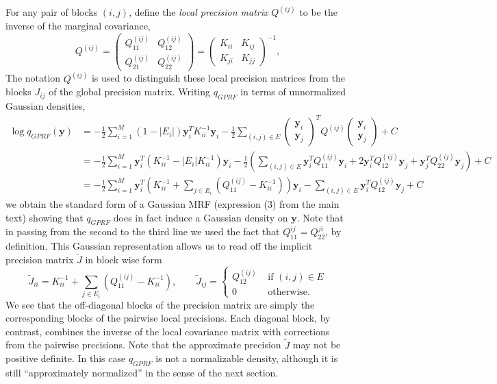\documentclass{article}
\renewcommand{\v}[1]{\mathbf{#1}}
\begin{document}
For any pair of blocks $(i,j)$, define the {\em local precision  matrix} $Q^{(ij)}$ to be the inverse of the marginal covariance,
\[Q^{(ij)} = \left(\begin{array}{cc} Q^{(ij)}_{11} &  Q^{(ij)}_{12}\\
  Q^{(ij)}_{21}  & Q^{(ij)}_{22}\end{array}\right) = \left(\begin{array}{cc} K_{ii} &  K_{ij}\\
  K_{ji}  & K_{jj}\end{array}\right)^{-1},\]
The notation $Q^{(ij)}$ is used to distinguish these local precision
matrices from the blocks $J_{ij}$ of the global precision matrix. Writing $q_{GPRF}$ in terms of unnormalized Gaussian densities,
\begin{align*}
\log q_{GPRF}(\v{y}) &= -\frac{1}{2} \sum_{i=1}^M (1-|E_i|) \v{y}_i^T
K_{ii}^{-1} \v{y}_i -\frac{1}{2}  \sum_{(i,j)\in E} \left(\begin{array}{c}
      \v{y}_i \\ \v{y}_j\end{array}\right)^T Q^{(ij)}\left(\begin{array}{c}
      \v{y}_i \\
      \v{y}_j\end{array}\right) + C\\
&= -\frac{1}{2}\sum_{i=1}^M  \v{y}_i^T \left(K_{ii}^{-1} - |E_i|
  K_{ii}^{-1}\right)\v{y}_i -\frac{1}{2}  \left(\sum_{(i,j)\in E} \v{y}_i^T
Q^{(ij)}_{11} \v{y}_i + 2\v{y}_i^T Q^{(ij)}_{12}\v{y}_j + \v{y}_j^T Q^{(ij)}_{22}\v{y}_j\right) + C\\
&= -\frac{1}{2}\sum_{i=1}^M  \v{y}_i^T \left(K_{ii}^{-1} + \sum_{j\in E_i}
\left(Q^{(ij)}_{11} - K_{ii}^{-1}\right) \right)\v{y}_i - \sum_{(i,j)\in E}
\v{y}_i^T Q^{(ij)}_{12} \v{y}_j + C
\end{align*}
we obtain the standard form of a Gaussian
MRF (expression (3) from the main text) showing that $q_{GPRF}$ does in fact induce a Gaussian density on
$\v{y}$. Note that in passing from the second to the third line we used the fact that $Q^{ij}_{11} = Q^{ji}_{22}$, by definition. This Gaussian representation allows us to read off the implicit precision matrix $\tilde{J}$ in block wise form
\begin{equation}
\tilde{J}_{ii} = K_{ii}^{-1} + \sum_{j\in E_i} \left(Q^{(ij)}_{11}
    - K_{ii}^{-1}\right), \qquad \tilde{J}_{ij} =
  \left\{\begin{array}{ll}Q^{(ij)}_{12} & \text{ if } (i,j) \in E\\0
    & \text{ otherwise.}\end{array}\right.\label{eqn:approx-precision}
\end{equation}
We see that the off-diagonal blocks of the precision matrix are simply
the corresponding blocks of the pairwise local precisions. Each
diagonal block, by contrast, combines the inverse of the local
covariance matrix with corrections from the pairwise
precisions. Note that the approximate precision $\tilde{J}$ may not be positive definite. In this case $q_{GPRF}$ is not a normalizable density,
although it is still ``approximately normalized'' in the sense of the next section. 
\end{document}
